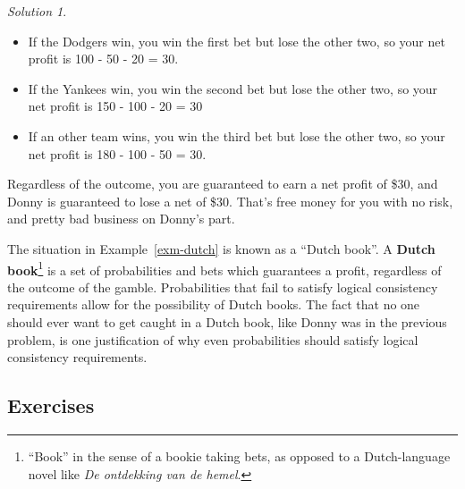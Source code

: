 \documentclass[
  letterpaper,
  DIV=11,
  numbers=noendperiod]{scrreprt}
\providecommand{\tightlist}{%
  \setlength{\itemsep}{0pt}\setlength{\parskip}{0pt}}
\theoremstyle{plain}
\theoremstyle{definition}
\theoremstyle{definition}
\theoremstyle{definition}
\theoremstyle{remark}
\newtheorem{refsolution}{Solution}[chapter]
\begin{document}
\begin{tcolorbox}
\begin{refsolution}
\begin{enumerate}
  \begin{itemize}
  \tightlist
  \item
    If the Dodgers win, you win the first bet but lose the other two, so
    your net profit is 100 - 50 - 20 = 30.
  \item
    If the Yankees win, you win the second bet but lose the other two,
    so your net profit is 150 - 100 - 20 = 30
  \item
    If an other team wins, you win the third bet but lose the other two,
    so your net profit is 180 - 100 - 50 = 30.
  \end{itemize}

  Regardless of the outcome, you are guaranteed to earn a net profit of
  \$30, and Donny is guaranteed to lose a net of \$30. That's free money
  for you with no risk, and pretty bad business on Donny's part.
\end{enumerate}

\label{sol-dutch-}

\end{refsolution}

\end{tcolorbox}

The situation in Example~\ref{exm-dutch} is known as a ``Dutch book''. A
\textbf{Dutch book}\footnote{``Book'' in the sense of a bookie taking
  bets, as opposed to a Dutch-language novel like \emph{De ontdekking
  van de hemel}.} is a set of probabilities and bets which guarantees a
profit, regardless of the outcome of the gamble. Probabilities that fail
to satisfy logical consistency requirements allow for the possibility of
Dutch books. The fact that no one should ever want to get caught in a
Dutch book, like Donny was in the previous problem, is one justification
of why even probabilities should satisfy logical consistency
requirements.

\subsection{Exercises}\label{exercises-2}
\end{document}
